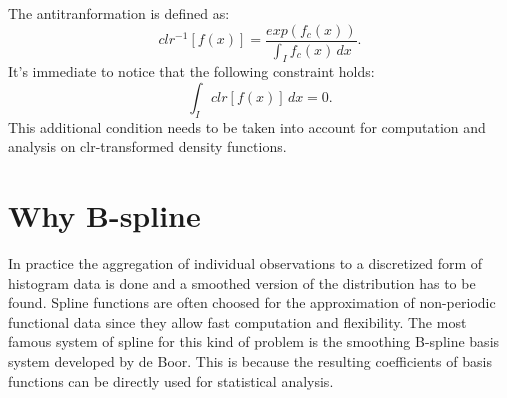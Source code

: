 The antitranformation is defined as: 
\[  clr^{-1}[f(x)]= \frac{exp(f_c(x))}{\int_{I} f_c(x)\, dx}. 	\]
It's immediate to notice that the following constraint holds:
\[	\int_{I} clr[f(x)]\, dx = 0. 			\]
This additional condition needs to be taken into account for computation and analysis on clr-transformed density functions.


\section{Why B-spline}
In practice the aggregation of individual observations to a discretized form of histogram data is done and a smoothed version of the distribution has to be found.
Spline functions are often choosed for the approximation of non-periodic functional data since they allow fast computation and flexibility. The most famous system of spline for this kind of problem is the smoothing B-spline basis system developed by de Boor. This is because the resulting coefficients of basis functions can be directly used for statistical analysis. %